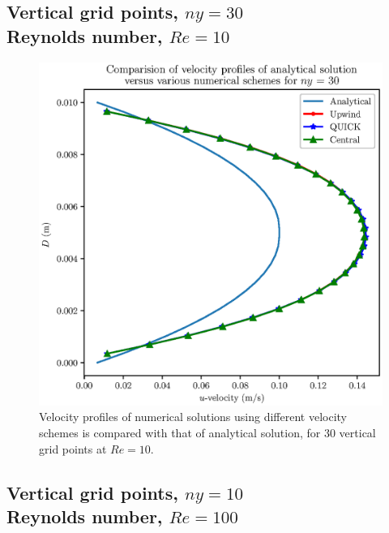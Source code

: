 \documentclass[12pt,a4paper,fleqn]{article}
\begin{document}
\subsection{Vertical grid points, \(ny=30\)\\
    Reynolds number, \(Re=10\)}

\begin{figure}[H]
    \centering
    \includegraphics[width=\textwidth]{ny-30_profilesComparison.eps}
    \caption{Velocity profiles of numerical solutions using different velocity schemes is compared with that of analytical solution, for 30 vertical grid points at \(Re = 10\).}
    \label{fig:ny-30_profilesComparison}
\end{figure}

\subsection{Vertical grid points, \(ny=10\)\\
    Reynolds number, \(Re=100\)}
\end{document}
